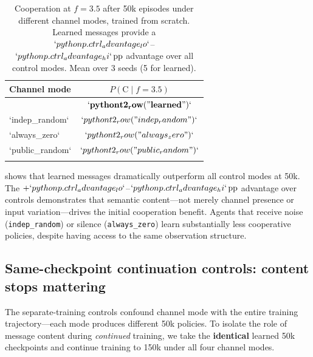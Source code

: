 \documentclass[
  10pt,
  letterpaper,
]{article}
\newcommand{\pcoopgiven}[1]{P(\text{C} \mid #1)}
\newcommand{\pp}{\text{\,pp}}
\begin{document}
\begin{table}[t]
  \caption{Cooperation at $f\!=\!3.5$ after 50k episodes under different channel modes, trained from scratch. Learned messages provide a $\ensuremath{`{python} p.ctrl_advantage_lo`}$--$\ensuremath{`{python} p.ctrl_advantage_hi`}\pp$ advantage over all control modes. Mean over 3 seeds (5 for learned).}
  
  \centering
  \small
  \begin{tabular}{lc}
    \toprule
    Channel mode & $\pcoopgiven{f\!=\!3.5}$ \\
    \midrule

\begin{verbatim}
`learned`        & $\mathbf{`{python} t2_row("learned")`}$ \\
`indep_random`  & $`{python} t2_row("indep_random")`$ \\
`always_zero`   & $`{python} t2_row("always_zero")`$ \\
`public_random` & $`{python} t2_row("public_random")`$ \\
\end{verbatim}

    \bottomrule
  \end{tabular}
\end{table}

\citet{tab:separate_controls} shows that learned messages dramatically
outperform all control modes at 50k. The
\(+`{python} p.ctrl_advantage_lo`\)--\(`{python} p.ctrl_advantage_hi`\pp\)
advantage over controls demonstrates that semantic content---not merely
channel presence or input variation---drives the initial cooperation
benefit. Agents that receive noise (\texttt{indep\_random}) or silence
(\texttt{always\_zero}) learn substantially less cooperative policies,
despite having access to the same observation structure.

\hypertarget{sec-sameckpt}{%
\subsection{Same-checkpoint continuation controls: content stops
mattering}\label{sec-sameckpt}}

The separate-training controls confound channel mode with the entire
training trajectory---each mode produces different 50k policies. To
isolate the role of message content during \emph{continued} training, we
take the \textbf{identical} learned 50k checkpoints and continue
training to 150k under all four channel modes.
\end{document}
